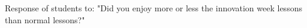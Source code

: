 Response of students to: "Did you enjoy more or less the innovation week lessons than normal lessons?"